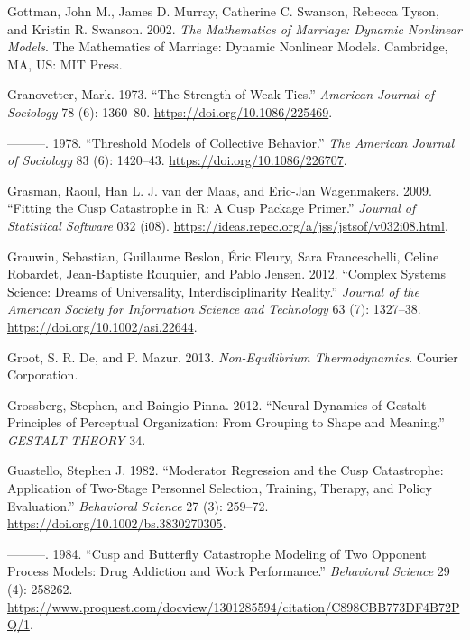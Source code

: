 \documentclass[
  a4paper,
  DIV=11,
  numbers=noendperiod,
  oneside]{scrreprt}
\newlength{\cslhangindent}
\newenvironment{CSLReferences}[2] %
 {\begin{list}{}{%
  \setlength{\itemindent}{0pt}
  \setlength{\leftmargin}{0pt}
  \setlength{\parsep}{0pt}
  \ifodd #1
   \setlength{\leftmargin}{\cslhangindent}
   \setlength{\itemindent}{-1\cslhangindent}
  \fi
  \setlength{\itemsep}{#2\baselineskip}}}
 {\end{list}}
\begin{document}
\begin{CSLReferences}{1}{0}
Gottman, John M., James D. Murray, Catherine C. Swanson, Rebecca Tyson,
and Kristin R. Swanson. 2002. \emph{The Mathematics of Marriage:
{Dynamic} Nonlinear Models}. The Mathematics of Marriage: {Dynamic}
Nonlinear Models. {Cambridge, MA, US}: {MIT Press}.

Granovetter, Mark. 1973. {``The Strength of Weak Ties.''} \emph{American
Journal of Sociology} 78 (6): 1360--80.
\url{https://doi.org/10.1086/225469}.

---------. 1978. {``Threshold {Models} of {Collective Behavior}.''}
\emph{The American Journal of Sociology} 83 (6): 1420--43.
\url{https://doi.org/10.1086/226707}.

Grasman, Raoul, Han L. J. van der Maas, and Eric-Jan Wagenmakers. 2009.
{``Fitting the Cusp Catastrophe in R: A Cusp Package Primer.''}
\emph{Journal of Statistical Software} 032 (i08).
\url{https://ideas.repec.org/a/jss/jstsof/v032i08.html}.

Grauwin, Sebastian, Guillaume Beslon, Éric Fleury, Sara Franceschelli,
Celine Robardet, Jean-Baptiste Rouquier, and Pablo Jensen. 2012.
{``Complex Systems Science: {Dreams} of Universality,
Interdisciplinarity Reality.''} \emph{Journal of the American Society
for Information Science and Technology} 63 (7): 1327--38.
\url{https://doi.org/10.1002/asi.22644}.

Groot, S. R. De, and P. Mazur. 2013. \emph{Non-Equilibrium
Thermodynamics}. Courier Corporation.

Grossberg, Stephen, and Baingio Pinna. 2012. {``Neural {Dynamics} of
{Gestalt Principles} of {Perceptual Organization}: {From Grouping} to
{Shape} and {Meaning}.''} \emph{GESTALT THEORY} 34.

Guastello, Stephen J. 1982. {``Moderator Regression and the Cusp
Catastrophe: {Application} of Two-Stage Personnel Selection, Training,
Therapy, and Policy Evaluation.''} \emph{Behavioral Science} 27 (3):
259--72. \url{https://doi.org/10.1002/bs.3830270305}.

---------. 1984. {``Cusp and Butterfly Catastrophe Modeling of Two
Opponent Process Models: Drug Addiction and Work Performance.''}
\emph{Behavioral Science} 29 (4): 258262.
\url{https://www.proquest.com/docview/1301285594/citation/C898CBB773DF4B72PQ/1}.


\end{CSLReferences}
\end{document}
